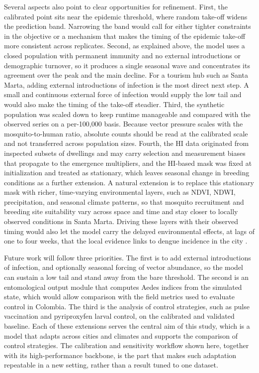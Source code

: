 \documentclass[applsci,article,accept,pdftex,moreauthors]{Definitions/mdpi}
\begin{document}
Several aspects also point to clear opportunities for refinement. First, the calibrated point sits near the epidemic threshold, where random take-off widens the prediction band. Narrowing the band would call for either tighter constraints in the objective or a mechanism that makes the timing of the epidemic take-off more consistent across replicates. Second, as explained above, the model uses a closed population with permanent immunity and no external introductions or demographic turnover, so it produces a single seasonal wave and concentrates its agreement over the peak and the main decline. For a tourism hub such as Santa Marta, adding external introductions of infection is the most direct next step. A small and continuous external force of infection would supply the low tail and would also make the timing of the take-off steadier. Third, the synthetic population was scaled down to keep runtime manageable and compared with the observed series on a per-100{,}000 basis. Because vector pressure scales with the mosquito-to-human ratio, absolute counts should be read at the calibrated scale and not transferred across population sizes. Fourth, the HI data originated from inspected subsets of dwellings and may carry selection and measurement biases that propagate to the emergence multipliers, and the HI-based mask was fixed at initialization and treated as stationary, which leaves seasonal change in breeding conditions as a further extension. A natural extension is to replace this stationary mask with richer, time-varying environmental layers, such as NDVI, NDWI, precipitation, and seasonal climate patterns, so that mosquito recruitment and breeding site suitability vary across space and time and stay closer to locally observed conditions in Santa Marta. Driving these layers with their observed timing would also let the model carry the delayed environmental effects, at lags of one to four weeks, that the local evidence links to dengue incidence in the city \cite{MARTIN2026100164}.

Future work will follow three priorities. The first is to add external introductions of infection, and optionally seasonal forcing of vector abundance, so the model can sustain a low tail and stand away from the bare threshold. The second is an entomological output module that computes Aedes indices from the simulated state, which would allow comparison with the field metrics used to evaluate control in Colombia. The third is the analysis of control strategies, such as pulse vaccination and pyriproxyfen larval control, on the calibrated and validated baseline. Each of these extensions serves the central aim of this study, which is a model that adapts across cities and climates and supports the comparison of control strategies. The calibration and sensitivity workflow shown here, together with its high-performance backbone, is the part that makes such adaptation repeatable in a new setting, rather than a result tuned to one dataset.
\end{document}
